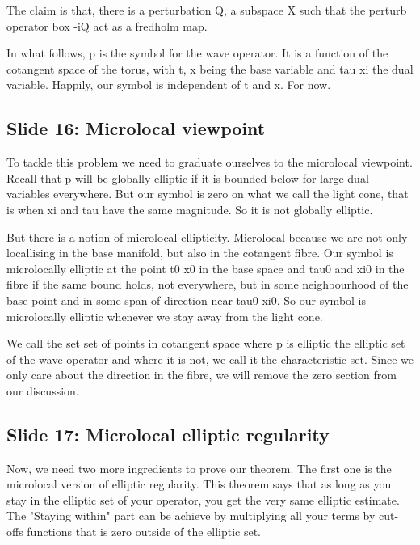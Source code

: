 \documentclass{article}
\begin{document}
The claim is that, there is a perturbation Q, a subspace X such that the perturb operator box -iQ act as a fredholm map. 

In what follows, p is the symbol for the wave operator. It is a function of the cotangent space of the torus, with t, x being the base variable and tau xi the dual variable. Happily, our symbol is independent of t and x. For now. 

\subsection{Slide 16: Microlocal viewpoint}
To tackle this problem we need to graduate ourselves to the microlocal viewpoint. 
Recall that p will be globally elliptic if it is bounded below for large dual variables everywhere. But our symbol is zero on what we call the light cone, that is when xi and tau have the same magnitude. So it is not globally elliptic. 

But there is a notion of microlocal ellipticity. Microlocal because we are not only locallising in the base manifold, but also in the cotangent fibre. Our symbol is microlocally elliptic at the point t0 x0 in the base space and tau0 and xi0 in the fibre if the same bound holds, not everywhere, but in some neighbourhood of the base point and in some span of direction near tau0 xi0. So our symbol is microlocally elliptic whenever we stay away from the light cone. 

We call the set set of points in cotangent space where p is elliptic the elliptic set of the wave operator and where it is not, we call it the characteristic set. Since we only care about the direction in the fibre, we will remove the zero section from our discussion. 


\subsection{Slide 17: Microlocal elliptic regularity}
Now, we need two more ingredients to prove our theorem. The first one is the microlocal version of elliptic regularity. This theorem says that as long as you stay in the elliptic set of your operator, you get the very same elliptic estimate. The "Staying within" part can be achieve by multiplying all your terms by cut-offs functions that is zero outside of the elliptic set. 
\end{document}
